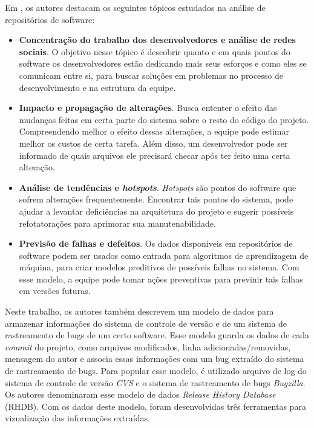 \documentclass[a4paper, 12pt, twoside]{book}
\begin{document}
        Em \cite{DBLP:series/springer/DAmbrosGLP08}, os autores destacam os seguintes tópicos 
        estudados na análise de repositórios de software:
        \begin{itemize}
            \item \textbf{Concentração do trabalho dos desenvolvedores e análise de redes sociais}. 
            O objetivo nesse tópico é descobrir quanto e em quais pontos do software os desenvolvedores estão dedicando mais seus esforços e como eles se comunicam entre si, para buscar soluções em problemas no processo de desenvolvimento e na estrutura da equipe.
            \item \textbf{Impacto e propagação de alterações}. 
            Busca ententer o efeito das mudanças feitas em
            certa parte do sistema sobre o resto do código do projeto. Compreendendo melhor o efeito
            dessas alterações, a equipe pode estimar melhor os custos de certa tarefa. Além disso,
            um desenvolvedor pode ser informado de quais arquivos ele precisará checar após ter feito
            uma certa alteração.
            \item \textbf{Análise de tendências e \textit{hotspots}}. 
            \textit{Hotspots} são pontos do software
            que sofrem alterações frequentemente. Encontrar tais pontos do sistema, pode ajudar a 
            levantar deficiências na arquitetura do projeto e sugerir possíveis refotatorações para
            aprimorar sua manutenabilidade.
            \item \textbf{Previsão de falhas e defeitos}.
            Os dados disponíveis em repositórios de software
            podem ser usados como entrada para algoritmos de aprendizagem de máquina, para criar
            modelos preditivos de possíveis falhas no sistema. Com esse modelo, a equipe pode
            tomar ações preventivas para previnir tais falhas em versões futuras.
        \end{itemize}

        Neste trabalho, os autores também descrevem um modelo de dados para armazenar informações do
        sistema de controle de versão e de um sistema de rastreamento de bugs de um certo software.
        Esse modelo guarda os dados de cada \textit{commit} do projeto, como arquivos modificados, linha adicionadas/removidas, mensagem do autor e associa essas informações com um bug extraído 
        do sistema de rastreamento de bugs. Para popular esse modelo, é utilizado arquivo de log
        do sistema de controle de versão \textit{CVS} e o sistema de rastreamento de bugs 
        \textit{Bugzilla}. Os autores denominaram esse modelo de dados \textit{Release History 
        Database} (RHDB). Com os dados deste modelo, foram desenvolvidas três ferramentas para 
        vizualização das informações extraídas.
\end{document}
